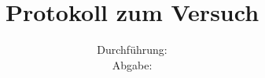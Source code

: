 \titlehead{\texttt{[image: ressources/logo.jpg]}}
\title{Protokoll zum Versuch  \\ }
\date{Durchführung:  \\ Abgabe:  }

